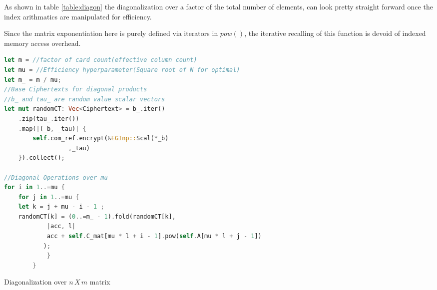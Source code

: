 \documentclass[12pt,a4paper]{report}
\begin{document}
As shown in table \ref{table:diagon} the diagonalization over a factor of the total number of elements,
can look pretty straight forward once the index arithmatics are manipulated for efficiency.

Since the matrix exponentiation here is purely defined via iterators in $pow()$, 
the iterative recalling of this function is devoid of indexed memory access overhead.\\

\begin{table}
\begin{lstlisting}[language=Rust]
let m = //factor of card count(effective column count)
let mu = //Efficiency hyperparameter(Square root of N for optimal)
let m_ = m / mu;
//Base Ciphertexts for diagonal products
//b_ and tau_ are random value scalar vectors
let mut randomCT: Vec<Ciphertext> = b_.iter()
	.zip(tau_.iter())
	.map(|(_b, _tau)| {
	    self.com_ref.encrypt(&EGInp::Scal(*_b) 
				  ,_tau)
	}).collect();

//Diagonal Operations over mu
for i in 1..=mu {
    for j in 1..=mu {
	let k = j + mu - i - 1 ;
	randomCT[k] = (0..=m_ - 1).fold(randomCT[k],
		    |acc, l|
			acc + self.C_mat[mu * l + i - 1].pow(self.A[mu * l + j - 1])
		   );
            }
        }
\end{lstlisting}
\caption{Diagonalization over $n\,X\,m$ matrix}
\label{table:diagon}
\end{table}
\end{document}
